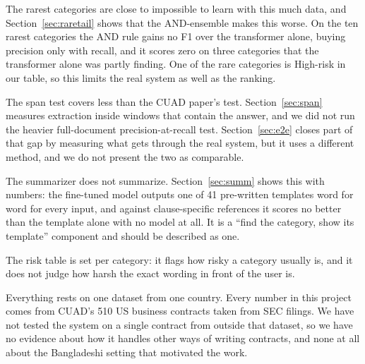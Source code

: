 The rarest categories are close to impossible to learn with this much data, and Section~\ref{sec:raretail} shows that the AND-ensemble makes this worse. On the ten rarest categories the AND rule gains no F1 over the transformer alone, buying precision only with recall, and it scores zero on three categories that the transformer alone was partly finding. One of the rare categories is High-risk in our table, so this limits the real system as well as the ranking.

The span test covers less than the CUAD paper's test. Section~\ref{sec:span} measures extraction inside windows that contain the answer, and we did not run the heavier full-document precision-at-recall test. Section~\ref{sec:e2e} closes part of that gap by measuring what gets through the real system, but it uses a different method, and we do not present the two as comparable.

The summarizer does not summarize. Section~\ref{sec:summ} shows this with numbers: the fine-tuned model outputs one of 41 pre-written templates word for word for every input, and against clause-specific references it scores no better than the template alone with no model at all. It is a ``find the category, show its template'' component and should be described as one.

The risk table is set per category: it flags how risky a category usually is, and it does not judge how harsh the exact wording in front of the user is.

Everything rests on one dataset from one country. Every number in this project comes from CUAD's 510 US business contracts taken from SEC filings. We have not tested the system on a single contract from outside that dataset, so we have no evidence about how it handles other ways of writing contracts, and none at all about the Bangladeshi setting that motivated the work.

